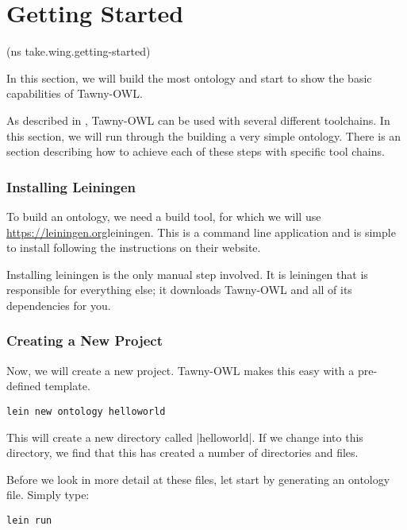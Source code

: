 \chapter{Getting Started}

\begin{tawnyhidden}
(ns take.wing.getting-started)
\end{tawnyhidden}

In this section, we will build the most ontology and start to show the
basic capabilities of Tawny-OWL.

As described in \label{/the/environment-the-environment}, Tawny-OWL can be
used with several different toolchains. In this section, we will run
through the building a very simple ontology. There is an section describing
how to achieve each of these steps with specific tool chains.

\subsection{Installing Leiningen}

To build an ontology, we need a build tool, for which we will use
\url{https://leiningen.org}{leiningen}. This is a command line
application and is simple to install following the instructions on
their website.

Installing leiningen is the only manual step involved. It is leiningen
that is responsible for everything else; it downloads Tawny-OWL and
all of its dependencies for you.

\subsection{Creating a New Project}

Now, we will create a new project. Tawny-OWL makes this easy with a
pre-defined template.

\begin{verbatim}
lein new ontology helloworld
\end{verbatim}

This will create a new directory called |helloworld|. If we change
into this directory, we find that this has created a number of
directories and files.

Before we look in more detail at these files, let start by generating
an ontology file. Simply type:

\begin{verbatim}
lein run
\end{verbatim}

